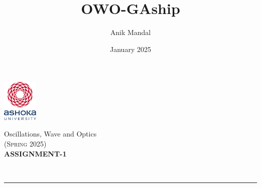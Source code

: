 \documentclass[12pt, a4paper]{article}
\title{OWO-GAship}
\author{Anik Mandal}
\date{January 2025}
\begin{document}
\begin{minipage}[t][][c]{0.1\textwidth}
    \begin{flushleft}
        \includegraphics[height=2cm]{tex-resources/Ashoka Logo.png}
    \end{flushleft}
\end{minipage}
\begin{minipage}[t][][c]{0.85\textwidth}
    \begin{center}
        {\LARGE Oscillations, Wave and Optics}\\ \vspace{0.5em}
        \textsc{(Spring 2025)}\\
        \vspace{1em}
        \textbf{\Large ASSIGNMENT-1} \\
    \end{center}
\end{minipage}
\vspace{10pt}\\
\rule[0em]{\textwidth}{0.75pt}
\end{document}
